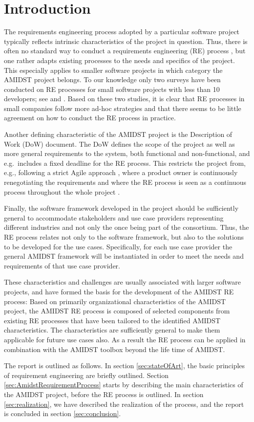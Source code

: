 \section{Introduction}

The requirements engineering process adopted by a particular software project typically reflects intrinsic
characteristics of the project in question. Thus, there is often no standard way to conduct a requirements engineering
(RE) process \cite{Poh10}, but one rather adapts existing processes to the needs and specifics of the project. This
especially applies to smaller software projects in which category the AMIDST project belongs. To our
knowledge only two surveys have been conducted on RE processes for small software projects with less than 10 developers;
see \cite{Qui10} and \cite{Ara07}.  Based on these two studies, it is clear that RE processes in small companies follow
more ad-hoc strategies and that there seems to be little agreement on how to conduct the RE process in practice. 
 
Another defining characteristic of the AMIDST project is the Description of Work (DoW) document. The DoW defines the scope of the
project as well as more general requirements to the system, both functional and non-functional, and e.g.\ includes a fixed deadline
for the RE process. This restricts the project from, e.g., following a strict Agile approach
\cite{Din10}, where a product owner is continuously renegotiating the requirements and where the RE process is seen as a
continuous process throughout the whole project \cite{Kav11}.

Finally, the software framework developed in the project should be sufficiently general to accommodate stakeholders and
use case providers representing different industries and not only the once being part of the consortium. Thus, the RE
process relates not only to the software framework, but also to the solutions to be developed for the use
cases. Specifically, for each use case provider the general AMIDST framework will be instantiated in order to meet the
needs and requirements of that use case provider.    

These characteristics and challenges are usually associated with larger software projects, and have  formed
the basis for the development of the AMIDST RE process: Based on primarily organizational characteristics of the AMIDST
project, the AMIDST RE process is composed of selected components from existing RE processes that have been tailored to
the identified AMIDST characteristics. The characteristics are sufficiently general to make them
applicable for future use cases also. As a result the RE process can be applied in combination with the AMIDST
toolbox beyond the life time of AMIDST.     

The report is outlined as follows.  In section \ref{sec:stateOfArt}, the basic principles of requirement engineering are
briefly outlined.  Section \ref{sec:AmidstRequirementProcess} starts by describing the main characteristics of the
AMIDST project, before the RE process is outlined.  In section \ref{sec:realization}, we have described the realization
of the process, and the report is concluded in section \ref{sec:conclusion}. 
